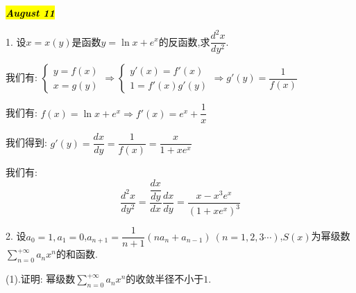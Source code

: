 \hl{\textbf{\textit{August 11}}}

1. 设$x=x(y)$是函数$y=\ln x+e^x$的反函数,求$\dfrac{d^2x}{dy^2}$.
\begin{solution}

	我们有:  $\left\lbrace
	\begin{array}{l}
		y=f(x)\\
		x=g(y)
	\end{array}
	\right. \Rightarrow \left\lbrace
	\begin{array}{l}
		y'(x)=f'(x)\\
		1=f'(x)g'(y)
	\end{array}
	\right. \Rightarrow g'(y)=\dfrac{1}{f(x)}$
	
	我们有:  $f(x)=\ln x+e^x\Rightarrow f'(x)=e^x+\dfrac{1}{x}$
	
	我们得到:  $g'(y)=\dfrac{dx}{dy}=\dfrac{1}{f(x)}=\dfrac{x}{1+xe^x}$
	
	我们有:  
	$$\dfrac{d^2x}{dy^2}=\dfrac{\dfrac{dx}{dy}}{dx}\dfrac{dx}{dy}=\dfrac{x-x^3e^x}{(1+xe^x)^3}$$
\end{solution}

2. 设$a_{0}=1,a_{1}=0$,$a_{n+1}=\dfrac{1}{n+1}(na_{n}+a_{n-1})\ (n=1,2,3\cdots)$,$S(x)$为幂级数$\sum\limits_{n=0}^{+\infty}a_{n}x^{n}$的和函数.

(1).证明:  幂级数$\sum\limits_{n=0}^{+\infty}a_{n}x^n$的收敛半径不小于$1$.

